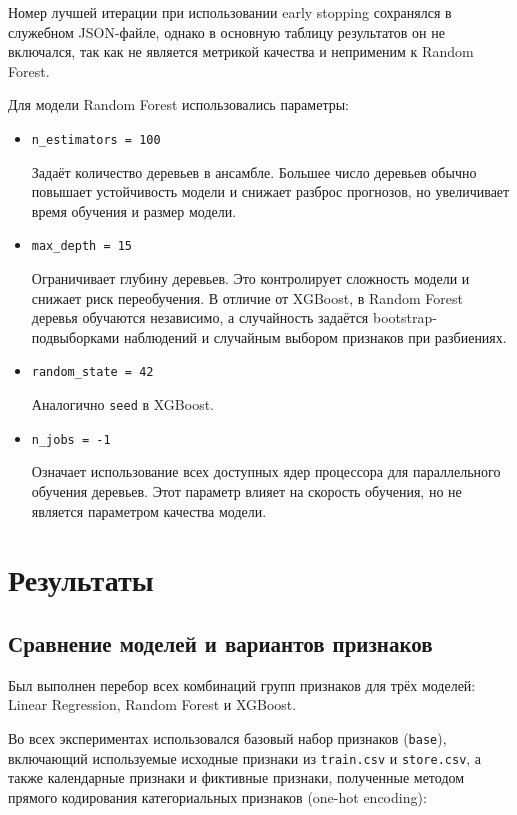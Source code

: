 \documentclass[12pt,a4paper]{article}
\numberwithin{equation}{section}
\begin{document}
Номер лучшей итерации при использовании early stopping сохранялся в служебном JSON-файле, однако в основную таблицу результатов он не включался, так как не является метрикой качества и неприменим к Random Forest.

Для модели Random Forest использовались параметры:
\begin{itemize}
    \item \texttt{n\_estimators = 100}
    
    Задаёт количество деревьев в ансамбле. Большее число деревьев обычно повышает устойчивость модели и снижает разброс прогнозов, но увеличивает время обучения и размер модели.
    \item \texttt{max\_depth = 15}

    Ограничивает глубину деревьев. Это контролирует сложность модели и снижает риск переобучения. В отличие от XGBoost, в Random Forest деревья обучаются независимо, а случайность задаётся bootstrap-подвыборками наблюдений и случайным выбором признаков при разбиениях.

    \item \texttt{random\_state = 42}

    Аналогично \texttt{seed} в XGBoost.
    \item \texttt{n\_jobs = -1}

    Означает использование всех доступных ядер процессора для параллельного обучения деревьев. Этот параметр влияет на скорость обучения, но не является параметром качества модели.
\end{itemize}

\section{Результаты}

\subsection{Сравнение моделей и вариантов признаков}

Был выполнен перебор всех комбинаций групп признаков для трёх моделей: Linear Regression, Random Forest и XGBoost.

Во всех экспериментах использовался базовый набор признаков (\texttt{base}), включающий используемые исходные признаки из \texttt{train.csv} и \texttt{store.csv}, а также календарные признаки и фиктивные признаки, полученные методом прямого кодирования категориальных признаков (one-hot encoding):
\end{document}
